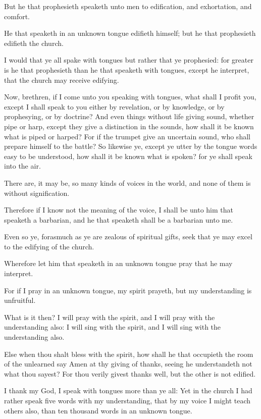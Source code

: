 \verse But he that prophesieth speaketh unto men to edification, and exhortation, and comfort.

\verse He that speaketh in an unknown tongue edifieth himself; but he that prophesieth edifieth the church.

\verse I would that ye all spake with tongues but rather that ye prophesied: for greater is he that prophesieth than he that speaketh with tongues, except he interpret, that the church may receive edifying.

\verse Now, brethren, if I come unto you speaking with tongues, what shall I profit you, except I shall speak to you either by revelation, or by knowledge, or by prophesying, or by doctrine?  \verse And even things without life giving sound, whether pipe or harp, except they give a distinction in the sounds, how shall it be known what is piped or harped?  \verse For if the trumpet give an uncertain sound, who shall prepare himself to the battle?  \verse So likewise ye, except ye utter by the tongue words easy to be understood, how shall it be known what is spoken? for ye shall speak into the air.

\verse There are, it may be, so many kinds of voices in the world, and none of them is without signification.

\verse Therefore if I know not the meaning of the voice, I shall be unto him that speaketh a barbarian, and he that speaketh shall be a barbarian unto me.

\verse Even so ye, forasmuch as ye are zealous of spiritual gifts, seek that ye may excel to the edifying of the church.

\verse Wherefore let him that speaketh in an unknown tongue pray that he may interpret.

\verse For if I pray in an unknown tongue, my spirit prayeth, but my understanding is unfruitful.

\verse What is it then? I will pray with the spirit, and I will pray with the understanding also: I will sing with the spirit, and I will sing with the understanding also.

\verse Else when thou shalt bless with the spirit, how shall he that occupieth the room of the unlearned say Amen at thy giving of thanks, seeing he understandeth not what thou sayest?  \verse For thou verily givest thanks well, but the other is not edified.

\verse I thank my God, I speak with tongues more than ye all: \verse Yet in the church I had rather speak five words with my understanding, that by my voice I might teach others also, than ten thousand words in an unknown tongue.

